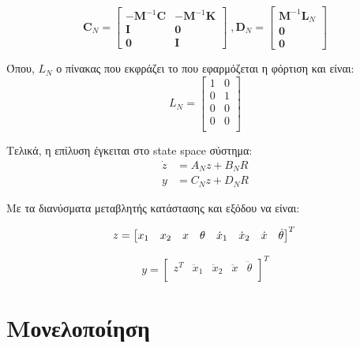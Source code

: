 \documentclass{article}
\begin{document}
$$
\mathbf{C}_N = 
\begin{bmatrix}
-\mathbf{M}^{-1} \mathbf{C} & -\mathbf{M}^{-1} \mathbf{K} \\
\mathbf{I} & \mathbf{0} \\
\mathbf{0} & \mathbf{I}
\end{bmatrix}\;, \mathbf{D}_N = 
\begin{bmatrix}
\mathbf{M}^{-1} \mathbf{L}_N \\
\mathbf{0} \\
\mathbf{0}
\end{bmatrix}
$$

Όπου, $L_N$ ο πίνακας που εκφράζει το που εφαρμόζεται η φόρτιση και είναι:
$$L_N = \begin{bmatrix}
    1 & 0\\
    0 & 1\\
    0 & 0\\
    0 & 0\\
\end{bmatrix}$$

Τελικά, η επίλυση έγκειται στο state space σύστημα:
\begin{equation}
    \begin{aligned}
        \dot{z} &= A_N z + B_N R\\
        y &= C_N z + D_N R
    \end{aligned}
\end{equation}

Με τα διανύσματα μεταβλητής κατάστασης και εξόδου να είναι:

\begin{equation}
    z =\begin{bmatrix}
    x_1 & x_2 & x & \theta & \dot{x}_1 & \dot{x}_2 & \dot{x} & \dot{\theta}\\
\end{bmatrix}^T\\
\end{equation}


\begin{equation}
    y=\begin{bmatrix}
    z^T & \ddot{x}_1 & \ddot{x}_2 & \ddot{x} & \ddot{\theta}\\
\end{bmatrix}^T
\end{equation}


\section{Μονελοποίηση}
\end{document}
